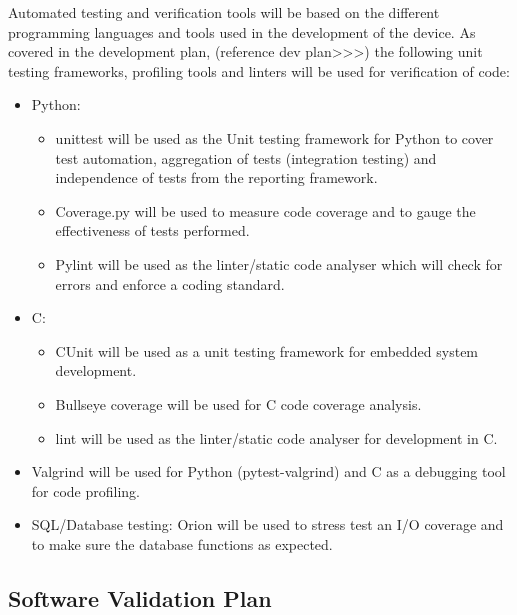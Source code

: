 \documentclass[12pt, titlepage]{article}
\begin{document}

Automated testing and verification tools will be based on the different programming languages and tools used in the development of the device. As covered in the development plan, (reference dev plan>>>) the following unit testing frameworks, profiling tools and linters will be used for verification of code:

\begin{itemize}
\item Python: 
	\begin{itemize}
		 \item unittest will be used as the Unit testing framework for Python to cover test automation, aggregation of tests (integration 							testing) and independence of tests from the reporting framework.
		\item Coverage.py will be used to measure code coverage and to gauge the effectiveness of tests performed.
		\item Pylint will be used as the linter/static code analyser which will check for errors and enforce a coding standard.
	\end{itemize}
\item C: 
	\begin{itemize}
	\item CUnit will be used as a unit testing framework for embedded system development.
	\item Bullseye coverage will be used for C code coverage analysis.
	\item lint will be used as the linter/static code analyser for development in C.
	\end{itemize}
\item Valgrind will be used for Python (pytest-valgrind) and C as a debugging tool for code profiling.
\item SQL/Database testing: Orion will be used to stress test an I/O coverage and to make sure the database functions as expected.
\end{itemize}

\subsection{Software Validation Plan}

\end{document}
